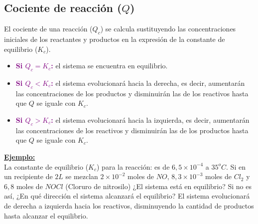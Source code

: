     \subsection{Cociente de reacción ($Q$)}
\sangria{} El cociente de una reacción ($Q_c$) se calcula sustituyendo las concentraciones iniciales de los reactantes y productos en la expresión de la constante de equilibrio ($K_c$). \begin{itemize} \item \textcolor{purple}{\textbf{Si $Q_c = K_c$:}} el sistema se encuentra en equilibrio. \item \textcolor{purple}{\textbf{Si $Q_c < K_c$:}} el sistema evolucionará hacia la derecha, es decir, aumentarán las concentraciones de los productos y disminuirán las de los reactivos hasta que $Q$ se iguale con $K_c$. \item \textcolor{purple}{\textbf{Si $Q_c > K_c$:}} el sistema evolucionará hacia la izquierda, es decir, aumentarán las concentraciones de los reactivos y disminuirán las de los productos hasta que $Q$ se iguale con $K_c$. \end{itemize}  \textbf{\underline{Ejemplo:}} \\ La constante de equilibrio ($K_c$) para la reacción:  es de $6,5 \times 10^{-4}$ a $35^oC$. Si en un recipiente de $2L$ se mezclan $2 \times 10^{-2}$ moles de $NO$, $8,3 \times 10^{-3}$ moles de $Cl_2$ y $6,8$ moles de $NOCl$ (Cloruro de nitrosilo) ¿El sistema está en equilibrio? Si no es así, ¿En qué dirección el sistema alcanzará el equilibrio?   \sangria{} El sistema evolucionará de derecha a izquierda hacia los reactivos, disminuyendo la cantidad de productos hasta alcanzar el equilibrio.
